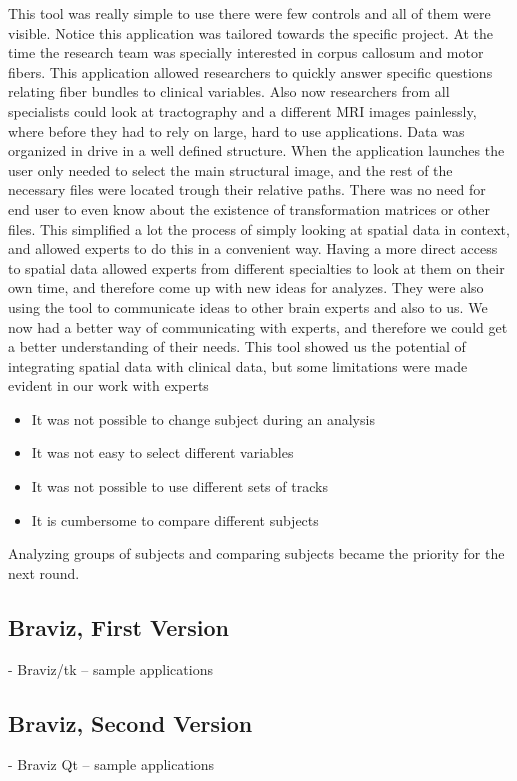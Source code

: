 This tool was really simple to use there were few controls and all of them were visible. Notice this application was tailored towards the specific project. At the time the research team was specially interested in corpus callosum and motor fibers. This application allowed researchers to quickly answer specific questions relating fiber bundles to clinical variables. Also now researchers from all specialists could look at tractography and a different MRI images painlessly, where before they had to rely on large, hard to use applications. Data was organized in drive in a well defined structure. When the application launches the user only needed to select the main structural image, and the rest of the necessary files were located trough their relative paths. There was no need for end user to even know about the existence of transformation matrices or other files. This simplified a lot the process of simply looking at spatial data in context, and allowed experts to do this in a convenient way. Having a more direct access to spatial data allowed experts from different specialties to look at them on their own time, and therefore come up with new ideas for analyzes. They were also using the tool to communicate ideas to other brain experts and also to us. We now had a better way of communicating with experts, and therefore we could get a better understanding of their needs. This tool showed us the potential of integrating spatial data with clinical data, but some limitations were made evident in our work with experts
\begin{itemize}
\item It was not possible to change subject during an analysis
\item It was not easy to select different variables
\item It was not possible to use different sets of tracks
\item It is cumbersome to compare different subjects
\end{itemize}

Analyzing groups of subjects and comparing subjects became the priority for the next round.

\subsection{Braviz, First Version}
- Braviz/tk
-- sample applications

\subsection{Braviz, Second Version}
- Braviz Qt
-- sample applications

